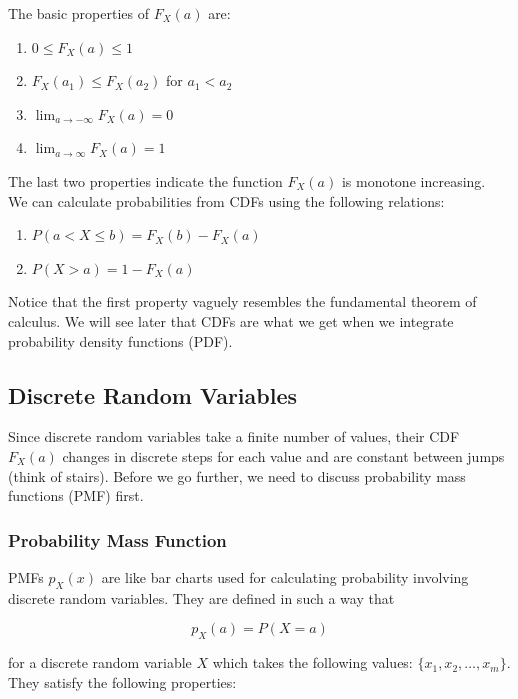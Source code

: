 The basic properties of $F_X(a)$ are:

\begin{enumerate}[i]
	\item $0 \le F_X(a) \le 1$
	\item $F_X(a_1) \le F_X(a_2)$ for $a_1 < a_2$
	\item $\displaystyle \lim_{a\to-\infty} F_X(a)=0$
	\item $\displaystyle \lim_{a\to\infty} F_X(a)=1$
\end{enumerate}

The last two properties indicate the function $F_X(a)$ is monotone increasing. \\

We can calculate probabilities from CDFs using the following relations:

\begin{enumerate}[i]
	\item $P(a<X\le b)=F_X(b)-F_X(a)$
	\item $P(X>a)=1-F_X(a)$
\end{enumerate}

Notice that the first property vaguely resembles the fundamental theorem of calculus. We will see later that CDFs are what we get when we integrate probability density functions (PDF). \\

\subsection{Discrete Random Variables}

Since discrete random variables take a finite number of values, their CDF $F_X(a)$ changes in discrete steps for each value and are constant between jumps (think of stairs). Before we go further, we need to discuss probability mass functions (PMF) first.

\subsubsection{Probability Mass Function}

PMFs $p_X(x)$ are like bar charts used for calculating probability involving discrete random variables. They are defined in such a way that

$$p_X(a)=P(X=a)$$

for a discrete random variable $X$ which takes the following values: $\{x_1, x_2, \dots, x_m\}$. They satisfy the following properties:

